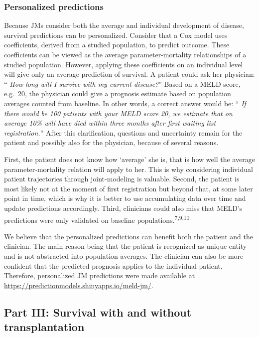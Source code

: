 \documentclass[11pt,english,]{book} %
\begin{document}
\hypertarget{personalized-predictions}{%
\subsubsection*{Personalized predictions}\label{personalized-predictions}}

Because JMs consider both the average and individual development of disease, survival predictions can be personalized. Consider that a Cox model uses coefficients, derived from a studied population, to predict outcome. These coefficients can be viewed as the average parameter-mortality relationships of a studied population. However, applying these coefficients on an individual level will give only an average prediction of survival. A patient could ask her physician: `` \emph{How long will I survive with my current disease?}'' Based on a MELD score, e.g.~20, the physician could give a prognosis estimate based on population averages counted from baseline. In other words, a correct answer would be: `` \emph{If there would be 100 patients with your MELD score 20, we estimate that on average 10\% will have died within three months after first waiting list registration.}'' After this clarification, questions and uncertainty remain for the patient and possibly also for the physician, because of several reasons.

First, the patient does not know how `average' she is, that is how well the average parameter-mortality relation will apply to her. This is why considering individual patient trajectories through joint-modeling is valuable. Second, the patient is most likely not at the moment of first registration but beyond that, at some later point in time, which is why it is better to use accumulating data over time and update predictions accordingly. Third, clinicians could also miss that MELD's predictions were only validated on baseline populations.\textsuperscript{7,9,10}

We believe that the personalized predictions can benefit both the patient and the clinician. The main reason being that the patient is recognized as unique entity and is not abstracted into population averages. The clinician can also be more confident that the predicted prognosis applies to the individual patient. Therefore, personalized JM predictions were made available at \url{https://predictionmodels.shinyapps.io/meld-jm/}.

\hypertarget{part-iii-survival-with-and-without-transplantation-1}{%
\subsection*{Part III: Survival with and without transplantation}\label{part-iii-survival-with-and-without-transplantation-1}}
\end{document}
